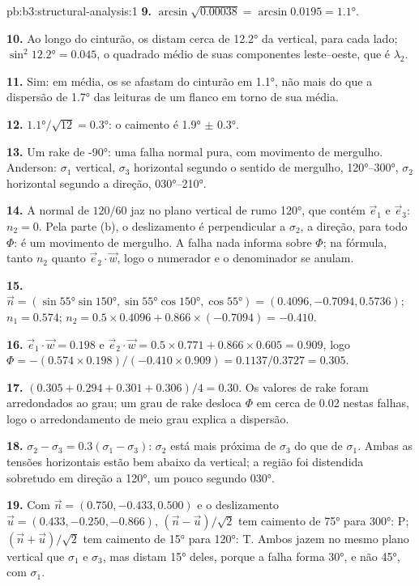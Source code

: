\begin{solution}{pb:b3:structural-analysis:1}
\textbf{9.} $\arcsin\sqrt{0.00038} = \arcsin0.0195 = \ang{1.1}$.

\textbf{10.} Ao longo do cinturão, os  distam cerca de \ang{12.2} da vertical,
para cada lado; $\sin^2\ang{12.2} = 0.045$, o quadrado médio de suas
componentes leste--oeste, que é $\lambda_2$.

\textbf{11.} Sim: em média, os  se afastam do cinturão em \ang{1.1}, não
mais do que a dispersão de \ang{1.7} das leituras de um flanco em torno de sua média.

\textbf{12.} $\ang{1.1}/\sqrt{12} = \ang{0.3}$: o caimento é \ang{1.9} $\pm$
\ang{0.3}.

\textbf{13.} Um rake de \ang{-90}: uma falha normal pura, com movimento de mergulho. Anderson:
$\sigma_1$ vertical, $\sigma_3$ horizontal segundo o sentido de mergulho,
\ang{120}--\ang{300}, $\sigma_2$ horizontal segundo a direção,
\ang{030}--\ang{210}.

\textbf{14.} A normal de $120/60$ jaz no plano vertical de rumo
\ang{120}, que contém $\vec e_1$ e $\vec e_3$: $n_2 = 0$. Pela parte (b), o
deslizamento é perpendicular a $\sigma_2$, a direção, para todo $\Phi$: é
um movimento de mergulho. A falha nada informa sobre $\Phi$; na fórmula, tanto $n_2$ quanto
$\vec e_2\cdot\vec w$, logo o numerador e o denominador se anulam.

\textbf{15.} $\vec n = (\sin\ang{55}\sin\ang{150}, \sin\ang{55}\cos\ang{150},
\cos\ang{55}) = (0.4096, -0.7094, 0.5736)$; $n_1 = 0.574$; $n_2 = 0.5\times
0.4096 + 0.866\times(-0.7094) = -0.410$.

\textbf{16.} $\vec e_1\cdot\vec w = 0.198$ e $\vec e_2\cdot\vec w = 0.5\times
0.771 + 0.866\times0.605 = 0.909$, logo $\Phi = -(0.574\times0.198)/(-0.410\times
0.909) = 0.1137/0.3727 = 0.305$.

\textbf{17.} $(0.305 + 0.294 + 0.301 + 0.306)/4 = 0.30$. Os valores de rake foram
arredondados ao grau; um grau de rake desloca $\Phi$ em cerca de 0.02 nestas
falhas, logo o arredondamento de meio grau explica a dispersão.

\textbf{18.} $\sigma_2 - \sigma_3 = 0.3(\sigma_1 - \sigma_3)$: $\sigma_2$ está
mais próxima de $\sigma_3$ do que de $\sigma_1$. Ambas as tensões horizontais estão bem
abaixo da vertical; a região foi distendida sobretudo em direção a \ang{120}, um
pouco segundo \ang{030}.

\textbf{19.} Com $\vec n = (0.750, -0.433, 0.500)$ e o deslizamento $\vec u =
(0.433, -0.250, -0.866)$, $(\vec n - \vec u)/\sqrt2$ tem caimento de \ang{75} para
\ang{300}: P; $(\vec n + \vec u)/\sqrt2$ tem caimento de \ang{15} para \ang{120}:
T. Ambos jazem no mesmo plano vertical que $\sigma_1$ e $\sigma_3$, mas
distam \ang{15} deles, porque a falha forma \ang{30}, e não \ang{45}, com
$\sigma_1$.


\end{solution}
